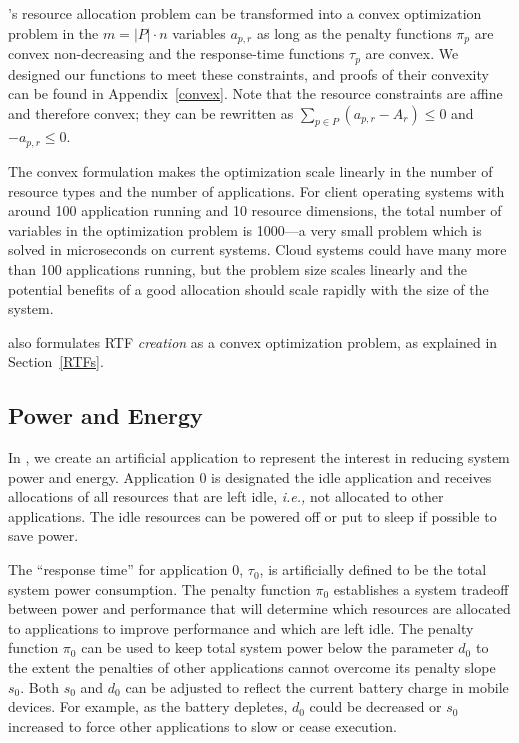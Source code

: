 \pacora's resource allocation problem can be transformed into a convex
optimization problem in the $m = |P|\cdot n$ variables $a_{p,r}$ as
long as the penalty functions $\pi_p$ are convex non-decreasing and
the response-time functions $\tau_p$ are convex.  We designed our
functions to meet these constraints, and proofs of their convexity can
be found in Appendix~\ref{convex}. Note that the resource constraints
are affine and therefore convex; they can be rewritten as $\sum_{p\in
  P} (a_{p,r} - A_r) \leq 0$ and $-a_{p,r} \leq 0$.

The convex formulation makes the optimization scale linearly in the
number of resource types and the number of applications.  For client
operating systems with around 100 application running and 10 resource
dimensions, the total number of variables in the optimization problem
is 1000---a very small problem which is solved in microseconds on
current systems.  Cloud systems could have many more than 100
applications running, but the problem size scales linearly and the
potential benefits of a good allocation should scale rapidly with the
size of the system.

\pacora also formulates RTF \emph{creation} as a convex optimization
problem, as explained in Section~\ref{RTFs}.

\subsection{Power and Energy}
In \pacora, we create an artificial application to represent the
interest in reducing system power and energy.  Application 0 is
designated the idle application and receives allocations of all
resources that are left idle, \emph{i.e.,} not allocated to other
applications.  The idle resources can be powered off or put to sleep
if possible to save power.

The ``response time'' for application 0, $\tau_0$, is artificially
defined to be the total system power consumption.
The penalty function $\pi_0$ establishes a system tradeoff between
power and performance that will determine which resources are
allocated to applications to improve performance and which are left
idle.  The penalty function $\pi_0$ can be used to keep total system
power below the parameter $d_0$ to the extent the penalties of other
applications cannot overcome its penalty slope $s_0$. Both $s_0$ and
$d_0$ can be adjusted to reflect the current battery charge in mobile
devices. For example, as the battery depletes, $d_0$ could be decreased or $s_0$ increased
to force other applications to slow or cease execution.




